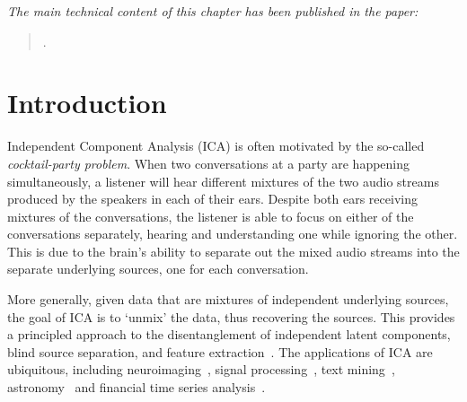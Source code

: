 \emph{The main technical content of this chapter has been published in the paper:}

\begin{quote}
	.
\end{quote}



\section{Introduction}


Independent Component Analysis (ICA) is often motivated by the so-called \emph{cocktail-party problem}.
When two conversations at a party are happening simultaneously, a listener will hear different mixtures of the two audio streams produced by the speakers in each of their ears.
Despite both ears receiving mixtures of the conversations, the listener is able to focus on either of the conversations separately, hearing and understanding one while ignoring the other.
This is due to the brain's ability to separate out the mixed audio streams into the separate underlying sources, one for each conversation.

More generally, given data that are mixtures of independent underlying sources, the goal of ICA is to `unmix' the data, thus recovering the sources.
This provides a principled approach to the disentanglement of independent latent components, blind source separation, and feature extraction~\citep{hyvarinen2000independent}.
The applications of ICA are ubiquitous, including neuroimaging~\citep{mckeown1998independent}, signal processing~\citep{sawada2003direction}, text mining~\citep{honkela2010wordica}, astronomy~\citep{nuzillard2000blind} and financial time series analysis~\citep{oja2000independent}.

